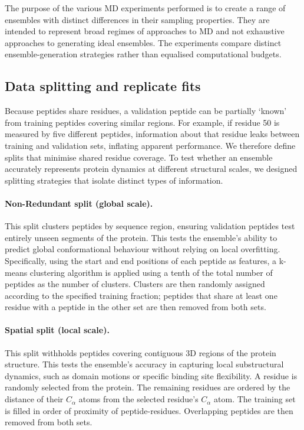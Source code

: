 The purpose of the various MD experiments performed is to create a range of ensembles with distinct differences in their sampling properties. They are intended to represent broad regimes of approaches to MD and not exhaustive approaches to generating ideal ensembles. The experiments compare distinct ensemble-generation strategies rather than equalised computational budgets.

\subsection{Data splitting and replicate fits}
\label{sec:valdx-splits}

Because peptides share residues, a validation peptide can be partially `known' from training peptides covering similar regions. For example, if residue 50 is measured by five different peptides, information about that residue leaks between training and validation sets, inflating apparent performance. We therefore define splits that minimise shared residue coverage. To test whether an ensemble accurately represents protein dynamics at different structural scales, we designed splitting strategies that isolate distinct types of information.

\paragraph{Non-Redundant split (global scale).}
This split clusters peptides by sequence region, ensuring validation peptides test entirely unseen segments of the protein. This tests the ensemble's ability to predict global conformational behaviour without relying on local overfitting. Specifically, using the start and end positions of each peptide as features, a k-means clustering algorithm is applied using a tenth of the total number of peptides as the number of clusters. Clusters are then randomly assigned according to the specified training fraction; peptides that share at least one residue with a peptide in the other set are then removed from both sets.

\paragraph{Spatial split (local scale).}
This split withholds peptides covering contiguous 3D regions of the protein structure. This tests the ensemble's accuracy in capturing local substructural dynamics, such as domain motions or specific binding site flexibility. A residue is randomly selected from the protein. The remaining residues are ordered by the distance of their $C_{\alpha}$ atoms from the selected residue's $C_{\alpha}$ atom. The training set is filled in order of proximity of peptide-residues. Overlapping peptides are then removed from both sets.

